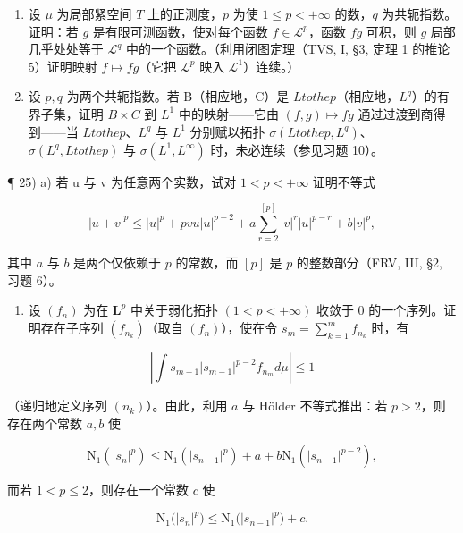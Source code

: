 \begin{enumerate}
\def\labelenumi{\arabic{enumi})}
\setcounter{enumi}{22}
\item
  设 \(\mu\) 为局部紧空间 \(T\) 上的正测度，\(p\) 为使 \(1 \leqslant p < +\infty\) 的数，\(q\) 为共轭指数。证明：若 \(g\) 是有限可测函数，使对每个函数 \(f \in \mathcal{L}^p\)，函数 \(fg\) 可积，则 \(g\) 局部几乎处处等于 \(\mathcal{L}^q\) 中的一个函数。（利用闭图定理（TVS, I, §3, 定理 1 的推论 5）证明映射 \(f \mapsto fg\)（它把 \(\mathcal{L}^p\) 映入 \(\mathcal{L}^1\)）连续。）
\item
  设 \(p, q\) 为两个共轭指数。若 B（相应地，C）是 \(L to the p\)（相应地，\(L^q\)）的有界子集，证明 \(B \times C\) 到 \(L^1\) 中的映射——它由 \((f, g) \mapsto fg\) 通过过渡到商得到——当 \(L to the p\)、\(L^q\) 与 \(L^1\) 分别赋以拓扑 \(\sigma(L to the p, L^q)\)、\(\sigma(L^q, L to the p)\) 与 \(\sigma(L^1, L^\infty)\) 时，未必连续（参见习题 10）。
\end{enumerate}

¶ 25) a) 若 u 与 v 为任意两个实数，试对 \(1 < p < +\infty\) 证明不等式

\[
| u + v | ^ {p} \leqslant | u | ^ {p} + p v u | u | ^ {p - 2} + a \sum_ {r = 2} ^ {[ p ]} | v | ^ {r} | u | ^ {p - r} + b | v | ^ {p},
\]

其中 \(a\) 与 \(b\) 是两个仅依赖于 \(p\) 的常数，而 \([p]\) 是 \(p\) 的整数部分（FRV, III, §2, 习题 6）。

\begin{enumerate}
\def\labelenumi{\alph{enumi})}
\setcounter{enumi}{1}
\tightlist
\item
  设 \((f_n)\) 为在 \(\mathbf{L}^p\) 中关于弱化拓扑 \((1 < p < +\infty)\) 收敛于 0 的一个序列。证明存在子序列 \((f_{n_k})\)（取自 \((f_n)\)），使在令 \(s_m = \sum_{k=1}^{m} f_{n_k}\) 时，有
\end{enumerate}

\[
\left| \int s _ {m - 1} | s _ {m - 1} | ^ {p - 2} f _ {n _ {m}} d \mu \right| \leqslant 1
\]

（递归地定义序列 \((n_k)\)）。由此，利用 \(a\) 与 Hölder 不等式推出：若 \(p > 2\)，则存在两个常数 \(a, b\) 使

\[
\mathrm{N} _ {1} (| s _ {n} | ^ {p}) \leqslant \mathrm{N} _ {1} (| s _ {n - 1} | ^ {p}) + a + b \mathrm{N} _ {1} (| s _ {n - 1} | ^ {p - 2}),
\]

而若 \(1 < p \leqslant 2\)，则存在一个常数 \(c\) 使

\[
\mathrm{N} _ {1} \big (| s _ {n} | ^ {p} \big) \leqslant \mathrm{N} _ {1} \big (| s _ {n - 1} | ^ {p} \big) + c.
\]

